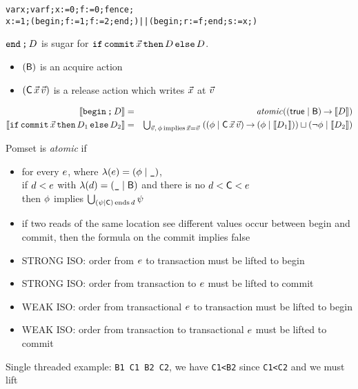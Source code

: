 \begin{alltt}
  var x; var f; x:=0; f:=0; fence; 
     x:=1; (begin; f:=1; f:=2; end;) || (begin; r:=f; end; s:=x;)
\end{alltt}
$\texttt{end}\,\texttt{;}\, D$ is sugar for $\texttt{if\,commit\,$\vec{x}$\,then}\, D \,\texttt{else}\, D$.

\begin{itemize}
\item $(\mathsf{B})$ is an acquire action
\item %
  $(\DC{\vec\aLoc}{\vec\aVal})$
  is a release action which writes $\vec{x}$ at $\vec{v}$
\end{itemize}

\begin{eqnarray*}
  \sem{\BEGIN\SEMI \bCmd}
  & = & \mathit{atomic}((\TRUE \mid \DB) \prefix \sem{\bCmd})
  \\
  \sem{\IFCOMMITTHEN \bCmd_1 \ELSE \bCmd_2}
  & = & \textstyle\bigcup_{\vec\aVal,\,\aForm\,\text{implies}\,\vec\aLoc=\vec\aVal}\;
        ((\aForm \mid \DC{\vec\aLoc}{\vec\aVal}) \prefix (\aForm \mid \sem{\bCmd_1}))
        \sqcup  (\lnot\aForm \mid \sem{\bCmd_2})
\end{eqnarray*}


Pomset is \emph{atomic} if
\begin{itemize}
\item for every $e$, where $\lambda(e)=(\phi\mid\texttt{\_})$, \\if
  $d<e$ with $\lambda(d)=(\texttt{\_}\mid\mathsf{B})$ and there is no
  $\bEv<\DC{}{}<\aEv$ \\then $\phi$ implies
  $\textstyle\bigcup_{(\bForm\mid\DC{}{})\,\text{ends}\,d}\bForm$
\item if two reads of the same location see different values occur between
  begin and commit, then the formula on the commit implies false
\item STRONG ISO: order from $e$ to transaction must be lifted to begin
\item STRONG ISO: order from transaction to $e$ must be lifted to commit
\item WEAK ISO: order from transactional $e$ to transaction must be lifted to begin 
\item WEAK ISO: order from transaction to transactional $e$ must be lifted to commit
\end{itemize}
Single threaded example: \texttt{B1 C1 B2 C2}, we have \texttt{C1<B2} since
\texttt{C1<C2} and we must lift


